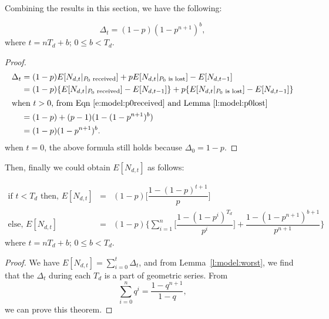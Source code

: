     Combining the results in this section, we have the following:
    \begin{lemma}
    \label{l:model:worst}
    \[
        \Delta_t = (1-p)(1-p^{n+1})^b,
    \]
    where $t=nT_d+b$; $0 \le b<T_d$.
    \end{lemma}
    \if{}
    \begin{proof}
    \begin{align*}
    \Delta_t &= (1-p)E[N_{d,t}|_\textrm{$P_0$ received}] + pE[N_{d,t}|_{\textrm{$P_0$ is lost}}]
    - E[N_{d,t-1}]\\
             &= (1-p)\{E[N_{d,t}|_\textrm{$P_0$ received}] - E[N_{d, t-1}]\} 
             + p\{E[N_{d,t}|_{\textrm{$P_0$ is lost}}] - E[N_{d, t-1}]\}\\
    \intertext{when $t>0$, from Eqn \ref{e:model:p0received} and Lemma~\ref{l:model:p0lost}}
             &= (1-p)+(p-1)(1-(1-p^{n+1})^b)\\
             &=(1-p)(1-p^{n+1})^b.
    \end{align*}
    when $t=0$, the above formula still holds because $\Delta_0 = 1-p$.
    \QED
    \end{proof}
    \fi

    Then, finally we could obtain $E[N_{d,t}]$ as
    follows:
    \begin{theorem}
    \label{t:model:worst}
    \begin{eqnarray*}
       \textrm{if $t<T_d$ then, } E[N_{d,t}] &=& (1-p)\Big[\dfrac{1-(1-p)^{t+1}}{p}\Big]\\ 
       \textrm{else, } E[N_{d,t}] &=& (1-p)\Big\{\sum_{i=1}^n\Big[\dfrac{1-(1-p^i)^{T_d}}{p^i}\Big] +
       \dfrac{1-(1-p^{n+1})^{b+1}}{p^{n+1}}\Big\}
    \end{eqnarray*}
    where $t=nT_d+b$; $0 \le b<T_d$.
    \end{theorem}
    \begin{proof}
    We have $E[N_{d,t}] = \sum_{i=0}^{t}\Delta_t$, and from Lemma~\ref{l:model:worst}, we
    find that the $\Delta_t$ during each $T_d$ is a part of geometric series. From
    \begin{displaymath}
        \sum_{i=0}^nq^i = \dfrac{1-q^{n+1}}{1-q}, 
    \end{displaymath}
    we can prove this theorem.
    \QED
    \end{proof}

